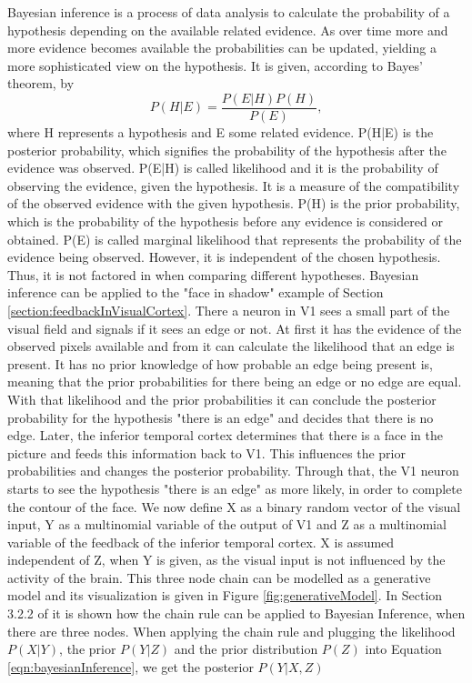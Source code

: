 Bayesian inference is a process of data analysis to calculate the probability of a hypothesis depending on the available related evidence. As over time more and more evidence becomes available the probabilities can be updated, yielding a more sophisticated view on the hypothesis. It is given, according to Bayes' theorem, by
\begin{equation}
\label{eqn:bayesianInference}
P(H|E) = \frac{P(E|H)P(H)}{P(E)},
\end{equation}
where H represents a hypothesis and E some related evidence. P(H|E) is the posterior probability, which signifies the probability of the hypothesis after the evidence was observed. P(E|H) is called likelihood and it is the probability of observing the evidence, given the hypothesis. It is a measure of the compatibility of the observed evidence with the given hypothesis. P(H) is the prior probability, which is the probability of the hypothesis before any evidence is considered or obtained. P(E) is called marginal likelihood that represents the probability of the evidence being observed. However, it is independent of the chosen hypothesis. Thus, it is not factored in when comparing different hypotheses.
Bayesian inference can be applied to the "face in shadow" example of Section \ref{section:feedbackInVisualCortex}. There a neuron in V1 sees a small part of the visual field and signals if it sees an edge or not. At first it has the evidence of the observed pixels available and from it can calculate the likelihood that an edge is present. It has no prior knowledge of how probable an edge being present is, meaning that the prior probabilities for there being an edge or no edge are equal. With that likelihood and the prior probabilities it can conclude the posterior probability for the hypothesis "there is an edge" and decides that there is no edge.
Later, the inferior temporal cortex determines that there is a face in the picture and feeds this information back to V1. This influences the prior probabilities and changes the posterior probability. Through that, the V1 neuron starts to see the hypothesis  "there is an edge" as more likely, in order to complete the contour of the face. 
We now define X as a binary random vector of the visual input, Y as a multinomial variable of the output of V1 and Z as a multinomial variable of the feedback of the inferior temporal cortex. X is assumed independent of Z, when Y is given, as the visual input is not influenced by the activity of the brain. This three node chain can be modelled as a generative model and its visualization is given in Figure \ref{fig:generativeModel}. In Section 3.2.2 of \citet{bayesInferenceBook} it is shown how the chain rule can be applied to Bayesian Inference, when there are three nodes. When applying the chain rule and plugging the likelihood $P(X|Y)$, the prior $P(Y|Z)$ and the prior distribution $P(Z)$ into Equation \ref{eqn:bayesianInference}, we get the posterior $P(Y|X,Z)$
